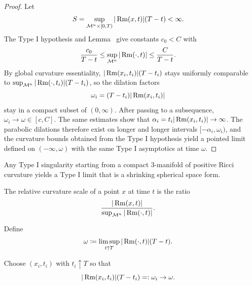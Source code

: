 \begin{proof}
Let
\[
S=\sup_{\mathcal M^n\times[0,T)}|\operatorname{Rm}(x,t)|(T-t)<\infty.
\]
The Type I hypothesis and Lemma~ give constants \(c_0<C\) with
\[
\frac{c_0}{T-t}\le \sup_{\mathcal M^n}|\operatorname{Rm}(\cdot,t)|\le \frac{C}{T-t}.
\]
By global curvature essentiality, \(|\operatorname{Rm}(x_i,t_i)|(T-t_i)\) stays uniformly comparable to \(\sup_{\mathcal M^n}|\operatorname{Rm}(\cdot,t_i)|(T-t_i)\), so the dilation factors
\[
\omega_i=(T-t_i)|\operatorname{Rm}(x_i,t_i)|
\]
stay in a compact subset of \((0,\infty)\). After passing to a subsequence, \(\omega_i\to\omega\in[c,C]\). The same estimates show that \(\alpha_i=t_i|\operatorname{Rm}(x_i,t_i)|\to\infty\). The parabolic dilations therefore exist on longer and longer intervals \([-\alpha_i,\omega_i)\), and the curvature bounds obtained from the Type I hypothesis yield a pointed limit defined on \((-\infty,\omega)\) with the same Type I asymptotics at time \(\omega\).
\end{proof}

\begin{remark}
\label{ch08-rem-shrinking-spherical-space-forms}
Any Type I singularity starting from a compact \(3\)-manifold of positive Ricci curvature yields a Type I limit that is a shrinking spherical space form.
\end{remark}

\begin{remark}
\label{ch08-rem-relative-curvature-scale}
The relative curvature scale of a point \(x\) at time \(t\) is the ratio
\[
\frac{|\operatorname{Rm}(x,t)|}{\sup_{\mathcal M^n}|\operatorname{Rm}(\cdot,t)|}.
\]
\end{remark}

\begin{definition}
\label{ch08-def-type-i-limsup-scale}
Define
\[
\omega\coloneqq \limsup_{t\uparrow T}|\operatorname{Rm}(\cdot,t)|(T-t).
\]
\end{definition}

\begin{definition}
\label{ch08-def-type-i-rescaling-factors}
Choose \((x_i,t_i)\) with \(t_i\uparrow T\) so that
\[
|\operatorname{Rm}(x_i,t_i)|(T-t_i)=:\omega_i\to\omega.
\]
\end{definition}

